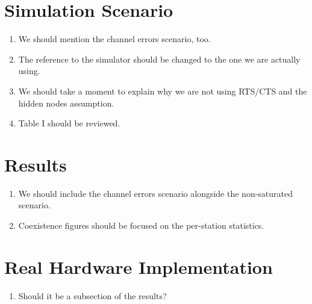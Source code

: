 \documentclass[]{article}
\begin{document}
\section{Simulation Scenario}
\begin{enumerate}
	\item We should mention the channel errors scenario, too.
	\item The reference to the simulator should be changed to the one we are actually using.
	\item We should take a moment to explain why we are not using RTS/CTS and the hidden nodes assumption.
	\item Table I should be reviewed.
\end{enumerate}

\section{Results}
\begin{enumerate}
	\item We should include the channel errors scenario alongside the non-saturated scenario.
	\item Coexistence figures should be focused on the per-station statistics.
\end{enumerate}

\section{Real Hardware Implementation}
\begin{enumerate}
	\item Should it be a subsection of the results?
\end{enumerate}
\end{document}
